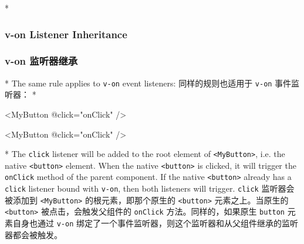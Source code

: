 \begin{paracol}{2}

\switchcolumn[0]*%
\subsubsection{v-on Listener Inheritance}
\switchcolumn
\subsubsection{v-on 监听器继承}
\switchcolumn[0]*%
The same rule applies to \texttt{v-on} event listeners:
\switchcolumn
同样的规则也适用于 \texttt{v-on} 事件监听器：
\switchcolumn[0]*%
\begin{codeHtml}
<MyButton @click="onClick" />
\end{codeHtml}
\switchcolumn
\begin{codeHtml}
<MyButton @click="onClick" />
\end{codeHtml}
\switchcolumn[0]*%
The \texttt{click} listener will be added to the root element of
\texttt{\textless{}MyButton\textgreater{}}, i.e. the native
\texttt{\textless{}button\textgreater{}} element. When the native
\texttt{\textless{}button\textgreater{}} is clicked, it will trigger the
\texttt{onClick} method of the parent component. If the native
\texttt{\textless{}button\textgreater{}} already has a \texttt{click}
listener bound with \texttt{v-on}, then both listeners will trigger.
\switchcolumn
\texttt{click} 监听器会被添加到
\texttt{\textless{}MyButton\textgreater{}} 的根元素，即那个原生的
\texttt{\textless{}button\textgreater{}} 元素之上。当原生的
\texttt{\textless{}button\textgreater{}} 被点击，会触发父组件的
\texttt{onClick} 方法。同样的，如果原生 \texttt{button} 元素自身也通过
\texttt{v-on}
绑定了一个事件监听器，则这个监听器和从父组件继承的监听器都会被触发。
\end{paracol}


